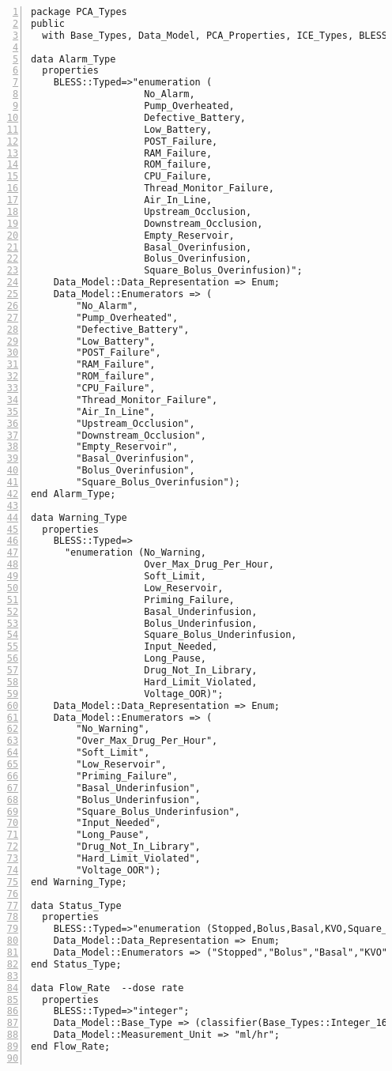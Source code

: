 \singlespacing
\begin{lstlisting}[language=aadl, gobble=0, numbers=left, caption={\lstinline{PCA_Types} package}]
package PCA_Types
public
  with Base_Types, Data_Model, PCA_Properties, ICE_Types, BLESS_Types, BLESS;

data Alarm_Type
  properties
    BLESS::Typed=>"enumeration (
					No_Alarm,
					Pump_Overheated,
					Defective_Battery,
					Low_Battery,
      				POST_Failure,
					RAM_Failure,
					ROM_failure,
					CPU_Failure,
					Thread_Monitor_Failure,
					Air_In_Line,
					Upstream_Occlusion,
					Downstream_Occlusion,
					Empty_Reservoir,
					Basal_Overinfusion,
					Bolus_Overinfusion,
					Square_Bolus_Overinfusion)";
    Data_Model::Data_Representation => Enum;
    Data_Model::Enumerators => (
    	"No_Alarm",
    	"Pump_Overheated",
    	"Defective_Battery",
    	"Low_Battery",
        "POST_Failure",
        "RAM_Failure",
        "ROM_failure",
        "CPU_Failure",
        "Thread_Monitor_Failure",
        "Air_In_Line",
        "Upstream_Occlusion",
        "Downstream_Occlusion",
        "Empty_Reservoir",
    	"Basal_Overinfusion",
    	"Bolus_Overinfusion",
    	"Square_Bolus_Overinfusion");
end Alarm_Type;  

data Warning_Type
  properties
    BLESS::Typed=>
      "enumeration (No_Warning,
					Over_Max_Drug_Per_Hour,
					Soft_Limit,
					Low_Reservoir,
					Priming_Failure,
					Basal_Underinfusion,
					Bolus_Underinfusion,
					Square_Bolus_Underinfusion,
					Input_Needed,
					Long_Pause,
					Drug_Not_In_Library,
					Hard_Limit_Violated,
					Voltage_OOR)";
    Data_Model::Data_Representation => Enum;
    Data_Model::Enumerators => (
    	"No_Warning",
    	"Over_Max_Drug_Per_Hour",
        "Soft_Limit",
        "Low_Reservoir",
        "Priming_Failure",
    	"Basal_Underinfusion",
    	"Bolus_Underinfusion",
    	"Square_Bolus_Underinfusion",
    	"Input_Needed",
    	"Long_Pause",
    	"Drug_Not_In_Library",
    	"Hard_Limit_Violated",
    	"Voltage_OOR");  	
end Warning_Type;

data Status_Type
  properties
    BLESS::Typed=>"enumeration (Stopped,Bolus,Basal,KVO,Square_Bolus)";
    Data_Model::Data_Representation => Enum;
    Data_Model::Enumerators => ("Stopped","Bolus","Basal","KVO","Square_Bolus");
end Status_Type;

data Flow_Rate  --dose rate
  properties
    BLESS::Typed=>"integer";
    Data_Model::Base_Type => (classifier(Base_Types::Integer_16));
    Data_Model::Measurement_Unit => "ml/hr";
end Flow_Rate;  


\end{lstlisting}
